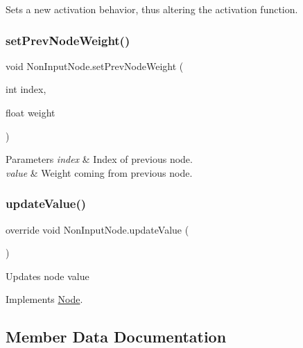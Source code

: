 Sets a new activation behavior, thus altering the activation function. 

\mbox{\label{class_non_input_node_a7c1d1f3d6b86394ade501797f1733472}} 
\subsubsection{\texorpdfstring{set\+Prev\+Node\+Weight()}{setPrevNodeWeight()}}
{\footnotesize\ttfamily void Non\+Input\+Node.\+set\+Prev\+Node\+Weight (\begin{DoxyParamCaption}\item[{int}]{index,  }\item[{float}]{weight }\end{DoxyParamCaption})}


\begin{DoxyParams}{Parameters}
{\em index} & Index of previous node.\\
\hline
{\em value} & Weight coming from previous node.\\
\hline
\end{DoxyParams}
\mbox{\label{class_non_input_node_a075d0278c5500f0d2455a3d8eeb04f55}} 
\subsubsection{\texorpdfstring{update\+Value()}{updateValue()}}
{\footnotesize\ttfamily override void Non\+Input\+Node.\+update\+Value (\begin{DoxyParamCaption}{ }\end{DoxyParamCaption})\hspace{0.3cm}{\ttfamily [virtual]}}



Updates node value 



Implements \mbox{\hyperlink{class_node_a85ebd0e36c25430570b94f923afd2a62}{Node}}.



\subsection{Member Data Documentation}
\mbox{\label{class_non_input_node_ab33f9a611488e5dfcb697941736f5cfc}} 

